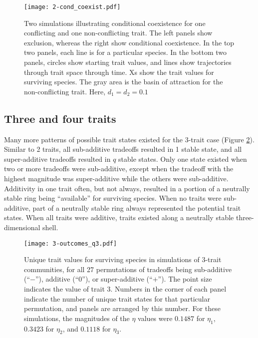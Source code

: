 \begin{figure}[ht!]
\centering
\texttt{[image: 2-cond\_coexist.pdf]}
\caption{Two simulations illustrating conditional coexistence for one
    conflicting and one non-conflicting trait.
    The left panels show exclusion, whereas the right show
    conditional coexistence.
    In the top two panels, each line is for a particular species.
    In the bottom two panels, circles show starting trait values,
    and lines show trajectories through trait space through time.
    Xs show the trait values for surviving species.
    The gray area is the basin of attraction for the
    non-conflicting trait.
    Here, $d_1 = d_2 = 0.1$}
\label{fig:cond-coexist}
\end{figure}




\subsection*{Three and four traits}


Many more patterns of possible trait states existed for the 3-trait case
(Figure \ref{fig:three-trait-outcomes}).
Similar to 2 traits, all sub-additive tradeoffs resulted in 1 stable state, and
all super-additive tradeoffs resulted in $q$ stable states.
Only one state existed when two or more tradeoffs were sub-additive,
except when the tradeoff with the highest magnitude was super-additive while
the others were sub-additive.
Additivity in one trait often, but not always, resulted in a portion of a
neutrally stable ring being ``available'' for surviving species.
When no traits were sub-additive, part of a neutrally stable ring
always represented the potential trait states.
When all traits were additive, traits existed along a neutrally stable 
three-dimensional shell.




\begin{figure}[ht!]
\centering
\texttt{[image: 3-outcomes\_q3.pdf]}
\caption{Unique trait values for surviving species in simulations of 3-trait communities,
    for all 27 permutations of tradeoffs being sub-additive (``$-$''), additive (``$0$''),
    or super-additive (``$+$'').
    The point size indicates the value of trait 3.
    Numbers in the corner of each panel indicate the number of unique trait states
    for that particular permutation, and panels are arranged by this number.
    For these simulations, the magnitudes of the $\eta$ values were 
    $0.1487$ for $\eta_1$, $0.3423$ for $\eta_2$, and $0.1118$ for $\eta_3$.}
\label{fig:three-trait-outcomes}
\end{figure}







